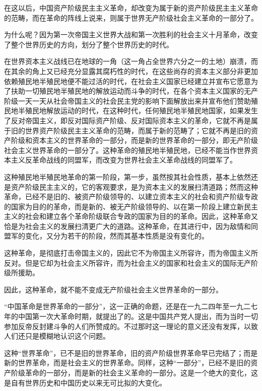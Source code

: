 在这以后，中国资产阶级民主主义革命，却改变为属于新的资产阶级民主主义革命的范畴，而在革命的阵线上说来，则属于世界无产阶级社会主义革命的一部分了。

为什么呢？因为第一次帝国主义世界大战和第一次胜利的社会主义十月革命，改变了整个世界历史的方向，划分了整个世界历史的时代。

在世界资本主义战线已在地球的一角（这一角占全世界六分之一的土地）崩溃，而在其余的角上又已经充分显露其腐朽性的时代，在这些尚存的资本主义部分非更加依赖殖民地半殖民地便不能过活的时代，在社会主义国家已经建立并宣布它愿意为了扶助一切殖民地半殖民地的解放运动而斗争的时代，在各个资本主义国家的无产阶级一天一天从社会帝国主义的社会民主党的影响下面解放出来并宣布他们赞助殖民地半殖民地解放运动的时代，在这种时代，任何殖民地半殖民地国家，如果发生了反对帝国主义，即反对国际资产阶级、反对国际资本主义的革命，它就不再是属于旧的世界资产阶级民主主义革命的范畴，而属于新的范畴了；它就不再是旧的资产阶级和资本主义的世界革命的一部分，而是新的世界革命的一部分，即无产阶级社会主义世界革命的一部分了。这种革命的殖民地半殖民地，已经不能当作世界资本主义反革命战线的同盟军，而改变为世界社会主义革命战线的同盟军了。

这种殖民地半殖民地革命的第一阶段，第一步，虽然按其社会性质，基本上依然还是资产阶级民主主义的，它的客观要求，是为资本主义的发展扫清道路；然而这种革命，已经不是旧的、被资产阶级领导的、以建立资本主义的社会和资产阶级专政的国家为目的的革命，而是新的、被无产阶级领导的、以在第一阶段上建立新民主主义的社会和建立各个革命阶级联合专政的国家为目的的革命。因此，这种革命又恰是为社会主义的发展扫清更广大的道路。这种革命，在其进行中，因为敌情和同盟军的变化，又分为若干的阶段，然而其基本性质是没有变化的。

这种革命，是彻底打击帝国主义的，因此它不为帝国主义所容许，而为帝国主义所反对。但是它却为社会主义所容许，而为社会主义的国家和社会主义的国际无产阶级所援助。

因此，这种革命，就不能不变成无产阶级社会主义世界革命的一部分。

“中国革命是世界革命的一部分”，这一正确的命题，还是在一九二四年至一九二七年的中国第一次大革命时期，就提出了的。这是中国共产党人提出，而为当时一切参加反帝反封建斗争的人们所赞成的。不过那时这一理论的意义还没有发挥，以致人们还只是模糊地认识这个问题。

这种“世界革命”，已不是旧的世界革命，旧的资产阶级世界革命早已完结了；而是新的世界革命，而是社会主义的世界革命。同样，这种“一部分”，已经不是旧的资产阶级革命的一部分，而是新的社会主义革命的一部分。这是一个绝大的变化，这是自有世界历史和中国历史以来无可比拟的大变化。

